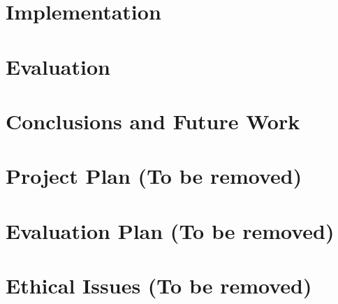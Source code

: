 \documentclass[12pt,twoside]{report}
\begin{document}
\chapter{Implementation}





\chapter{Evaluation}



\chapter{Conclusions and Future Work}


\chapter{Project Plan (To be removed)}


\chapter{Evaluation Plan (To be removed)}


\chapter{Ethical Issues (To be removed)}


\printbibliography
\end{document}
